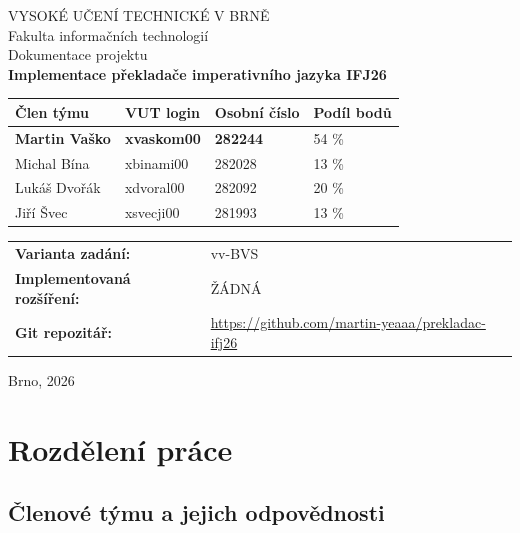 \documentclass[10pt,a4paper]{article}
\newcommand{\nazevprojektu}{Implementace překladače imperativního jazyka IFJ26}
\newcommand{\varianta}{vv-BVS}
\newcommand{\gitrepo}{https://github.com/martin-yeaaa/prekladac-ifj26}
\begin{document}
\begin{titlepage}
    \centering
    {\large VYSOKÉ UČENÍ TECHNICKÉ V BRNĚ}\\[0.3cm]
    {\large Fakulta informačních technologií}\\[2.0cm]

    {\Large Dokumentace projektu}\\[0.5cm]
    {\huge\bfseries \nazevprojektu}\\[1.5cm]

    \begin{tabularx}{\textwidth}{|l|Y|Y|Y|}
        \hline
        \textbf{Člen týmu} & \textbf{VUT login} & \textbf{Osobní číslo} & \textbf{Podíl bodů} \\
        \hline
        \textbf{Martin Vaško} & \textbf{xvaskom00} & \textbf{282244} & 54 \% \\
        \hline
        Michal Bína & xbinami00 & 282028 & 13 \% \\
        \hline
        Lukáš Dvořák & xdvoral00 & 282092 & 20 \% \\
        \hline
        Jiří Švec & xsvecji00 & 281993 & 13 \% \\
        \hline
    \end{tabularx}

    \vspace{1.0cm}
    \begin{tabularx}{\textwidth}{lY}
        \textbf{Varianta zadání:} & \varianta \\
        \textbf{Implementovaná rozšíření:} &ŽÁDNÁ \\
        \textbf{Git repozitář:} & \url{\gitrepo} \\
    \end{tabularx}

    \vfill
    {\large Brno, 2026}
\end{titlepage}

\tableofcontents
\newpage

\section{Rozdělení práce}

\subsection{Členové týmu a jejich odpovědnosti}
\end{document}

